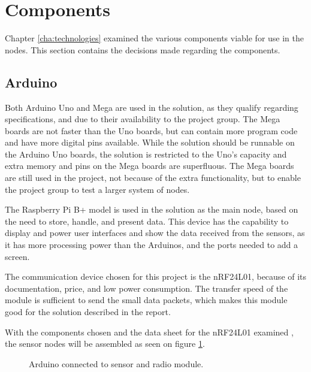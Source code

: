 \section{Components}
Chapter \ref{cha:technologies} examined the various components viable for use in the nodes. This section contains the decisions made regarding the components.

\subsection{Arduino}
Both Arduino Uno and Mega are used in the solution, as they qualify regarding specifications, and due to their availability to the project group. The Mega boards are not faster than the Uno boards, but can contain more program code and have more digital pins available. While the solution should be runnable on the Arduino Uno boards, the solution is restricted to the Uno's capacity and extra memory and pins on the Mega boards are superfluous. The Mega boards are still used in the project, not because of the extra functionality, but to enable the project group to test a larger system of nodes.

The Raspberry Pi B+ model is used in the solution as the main node, based on the need to store, handle, and present data. This device has the capability to display and power user interfaces and show the data received from the sensors, as it has more processing power than the Arduinos, and the ports needed to add a screen.

The communication device chosen for this project is the nRF24L01, because of its documentation, price, and low power consumption. The transfer speed of the module is sufficient to send the small data packets, which makes this module good for the solution described in the report.

With the components chosen and the data sheet for the nRF24L01 examined \cite{nf24datasheet}, the sensor nodes will be assembled as seen on figure \ref{fig:compsketch}.

\begin{figure}[!h]
	\centering
	\caption{Arduino connected to sensor and radio module.}
	\label{fig:compsketch}
\end{figure}

